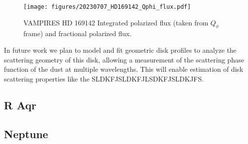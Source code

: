 \begin{figure}
    \centering
    \texttt{[image: figures/20230707\_HD169142\_Qphi\_flux.pdf]}
    \caption{ VAMPIRES HD 169142 Integrated polarized flux (taken from $Q_\phi$ frame) and fractional polarized flux.\label{fig:hd169142_flux}}
\end{figure}

In future work we plan to model and fit geometric disk profiles to analyze the scattering geometry of this disk, allowing a measurement of the scattering phase function of the dust at multiple wavelengths. This will enable estimation of disk scattering properties like the SLDKFJSLDKFJLSDKFJSLDKJFS.

\subsection{R Aqr\label{sec:raqr}}

\subsection{Neptune\label{sec:neptune}}
